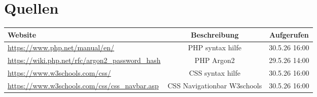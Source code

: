 \section{Quellen}
\noident
\begin{tabularx}{\textwidth}{| Y | c | c |}
	\hline
	Website & Beschreibung & Aufgerufen \\[0.5ex]
	\hline\hline
	\url{https://www.php.net/manual/en/} & PHP syntax hilfe & 30.5.26 16:00\\
	\hline
	\url{https://wiki.php.net/rfc/argon2_password_hash} & PHP Argon2 & 29.5.26 14:00\\
	\hline
	\url{https://www.w3schools.com/css/} & CSS syntax hilfe & 30.5.26 16:00\\
	\hline
	\url{https://www.w3schools.com/css/css_navbar.asp} & CSS Navigationbar W3schools & 30.5.26 16:00\\
	\hline
\end{tabularx}
\newpage
